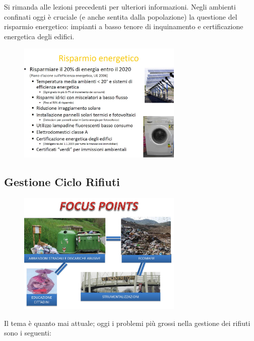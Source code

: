 Si rimanda alle lezioni precedenti per ulteriori informazioni. Negli
ambienti confinati oggi è cruciale (e anche sentita dalla popolazione)
la questione del risparmio energetico: impianti a basso tenore di
inquinamento e certificazione energetica degli edifici.
\begin{figure}[!ht]
\centering
	\includegraphics[width=0.7\textwidth]{23/image13.jpg}
	\end{figure}

\subsection{Gestione Ciclo Rifiuti}
 

\begin{figure}[!ht]
\centering
	\includegraphics[width=0.7\textwidth]{23/image14.jpg}
	\end{figure}

Il tema è quanto mai attuale; oggi i problemi più grossi nella gestione
dei rifiuti sono i seguenti:

